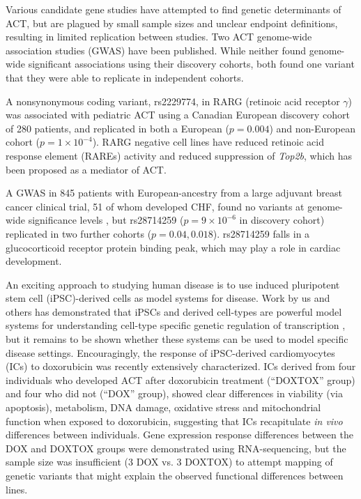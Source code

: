 \documentclass{article}
\begin{document}
{Various candidate gene studies have attempted to find genetic determinants of ACT, but are plagued by small sample sizes and unclear endpoint definitions, resulting in limited replication between studies. 
Two ACT genome-wide association studies (GWAS) have been published. 
While neither found genome-wide significant associations using their discovery cohorts, both found one variant that they were able to replicate in independent cohorts. 

A nonsynonymous coding variant, rs2229774, in RARG (retinoic acid receptor $\gamma$) was associated with pediatric ACT using a Canadian European discovery cohort of 280 patients\cite{Aminkeng2015}, and replicated in both a European ($p=0.004$) and non-European cohort ($p=1 \times 10^{-4}$). 
RARG negative cell lines have reduced retinoic acid response element (RAREs) activity and reduced suppression of \emph{Top2b}\cite{Aminkeng2015}, which has been proposed as a mediator of ACT. 

A GWAS in 845 patients with European-ancestry from a large adjuvant breast cancer clinical trial, 51 of whom developed CHF, found no variants at genome-wide significance levels\cite{Schneider2016} , but rs28714259 ($p=9 \times 10^{-6}$ in discovery cohort) replicated in two further cohorts ($p=0.04, 0.018$). 
rs28714259 falls in a glucocorticoid receptor protein binding peak, which may play a role in cardiac development. 

An exciting approach to studying human disease is to use induced pluripotent stem cell (iPSC)-derived cells as model systems for disease. Work by us and others has demonstrated that iPSCs and derived cell-types are powerful model systems for understanding cell-type specific genetic regulation of transcription \citep{Thomas2015,Burrows2016,Banovich2017,hipsci}, but it remains to be shown whether these systems can be used to model specific disease settings. Encouragingly, the response of iPSC-derived cardiomyocytes (ICs) to doxorubicin was recently extensively characterized\cite{Burridge2016}. ICs derived from four individuals who developed ACT after doxorubicin treatment (``DOXTOX'' group) and four who did not (``DOX'' group), showed clear differences in viability (via apoptosis), metabolism, DNA damage, oxidative stress and mitochondrial function when exposed to doxorubicin, suggesting that ICs recapitulate \emph{in vivo} differences between individuals. Gene expression response differences between the DOX and DOXTOX groups were demonstrated using RNA-sequencing, but the sample size was insufficient (3 DOX vs. 3 DOXTOX) to attempt mapping of genetic variants that might explain the observed functional differences between lines. 

}
\end{document}
